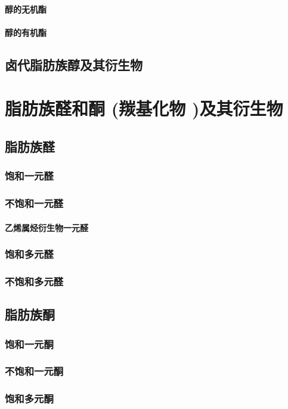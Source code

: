 \documentclass[UTF8]{../03-Chemistry}
\begin{document}
            \paragraph{醇的无机酯}
            \paragraph{醇的有机酯}
    \subsection{卤代脂肪族醇及其衍生物}


\section{脂肪族醛和酮 (羰基化物 )及其衍生物}
    \subsection{脂肪族醛}
        \subsubsection{饱和一元醛}
        \subsubsection{不饱和一元醛}
            \paragraph{乙烯属烃衍生物一元醛}
        \subsubsection{饱和多元醛}
        \subsubsection{不饱和多元醛}
    \subsection{脂肪族酮}
        \subsubsection{饱和一元酮}
        \subsubsection{不饱和一元酮}
        \subsubsection{饱和多元酮}
\end{document}
